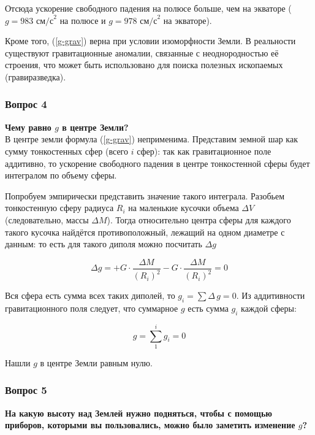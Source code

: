 \documentclass[a4paper,12pt]{article}
\begin{document}
		Отсюда ускорение свободного падения на полюсе больше, чем на экваторе ($g = \text{983 см/с}^2$ на полюсе и $g = \text{978 см/с}^2$ на экваторе).

		Кроме того, (\ref{g-grav}) верна при условии изоморфности Земли. В реальности существуют гравитационные аномалии, связанные с неоднородностью её строения, что может быть использовано для поиска полезных ископаемых (гравиразведка).


\subsubsection{Вопрос 4}

\textbf{Чему равно $g$ в центре Земли?}
\\

		В центре земли формула (\ref{g-grav}) неприменима. Представим земной шар как сумму тонкостенных сфер (всего $i$ сфер): так как гравитационное поле аддитивно, то ускорение свободного падения в центре тонкостенной сферы будет интегралом по объему сферы. 

		Попробуем эмпирически представить значение такого интеграла. Разобьем тонкостенную сферу радиуса $R_i$ на маленькие кусочки объема $\Delta{}V$ (следовательно, массы $\Delta{}M$). Тогда относительно центра сферы для каждого такого кусочка найдётся противоположный, лежащий на одном диаметре с данным: то есть для такого диполя можно посчитать $\Delta{}g$

		\begin{equation}
			\Delta{}g=+G\cdot\frac{\Delta{}M}{(R_i)^2}-G\cdot\frac{\Delta{}M}{(R_i)^2}=0
		\end{equation}

		Вся сфера есть сумма всех таких диполей, то $g_i=\sum\Delta\,g=0$. Из аддитивности гравитационного поля следует, что суммарное $g$ есть сумма $g_i$  каждой сферы:

		\begin{equation}
			g=\sum\limits_{1}^{i}g_i=0
		\end{equation}

		Нашли ${g}$ в центре Земли равным нулю.

\subsubsection{Вопрос 5}

\textbf{На какую высоту над Землей нужно подняться, чтобы с помощью приборов, которыми вы пользовались, можно было заметить изменение $g$?}
\\
\end{document}
